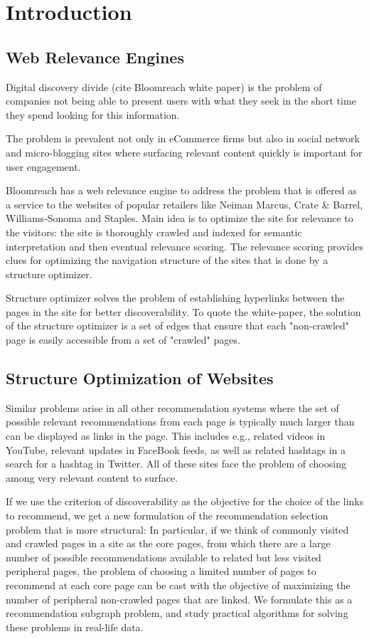 \section{Introduction}

\subsection{Web Relevance Engines}
Digital discovery divide (cite Bloomreach white paper) is the problem of companies not being able to present users with what they seek in the short time they spend looking for this information.

The problem is prevalent not only in eCommerce firms but also in social network and micro-blogging sites where surfacing relevant content quickly is important for user engagement.

Bloomreach has a web relevance engine to address the problem that is offered as a service to the websites of popular retailers like Neiman Marcus, Crate \& Barrel, Williams-Sonoma and Staples. Main idea is to optimize the site for relevance to the visitors: the site is thoroughly crawled and indexed for semantic interpretation and then eventual relevance scoring. The relevance scoring provides clues for optimizing the navigation structure of the sites that is done by a structure optimizer.

Structure optimizer solves the problem of establishing hyperlinks between the pages in the site for better discoverability. To quote the white-paper, the solution of the structure optimizer is a set of edges that ensure that each "non-crawled" page is easily accessible from a set of "crawled" pages.

\subsection{Structure Optimization of Websites}
Similar problems arise in all other recommendation systems where the set of possible relevant recommendations from each page is typically much larger than can be displayed as links in the page. This includes e.g., related videos in YouTube, relevant updates in FaceBook feeds, as well as related hashtags in a search for a hashtag in Twitter. All of these sites face the problem of choosing among very relevant content to surface.

If we use the criterion of discoverability as the objective for the choice of the links to recommend, we get a new formulation of the recommendation selection problem that is more structural: In particular, if we think of commonly visited and crawled pages in a site as the core pages, from which there are a large number of possible recommendations available to related but less visited peripheral pages, the problem of choosing a limited number of pages to recommend at each core page can be cast with the objective of maximizing the number of peripheral non-crawled pages that are linked. We formulate this as a recommendation subgraph problem, and study practical algorithms for solving these problems in real-life data.

